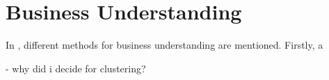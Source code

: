 \chapter{Business Understanding}
In \cite{CRISPDM2000}, different methods for business understanding are mentioned. Firstly, a 

- why did i decide for clustering?
